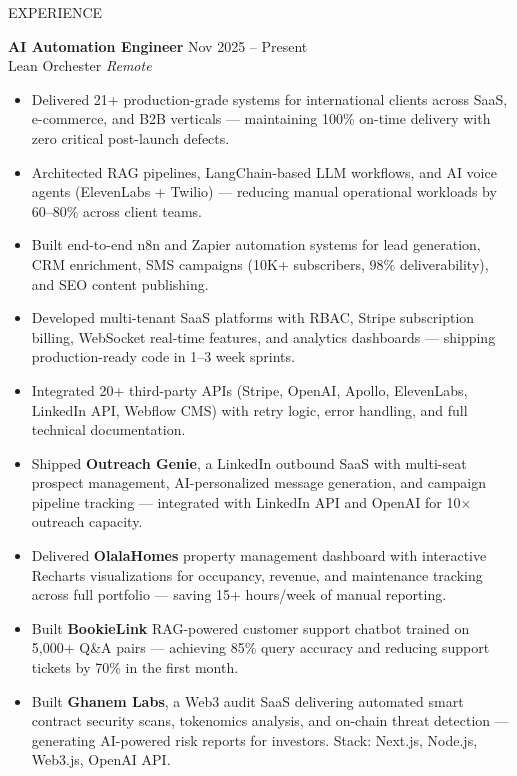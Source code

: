 \documentclass{resume}
\begin{document}

\begin{rSection}{EXPERIENCE}

\textbf{AI Automation Engineer} \hfill Nov 2025 -- Present \\
Lean Orchester \hfill \textit{Remote}
\begin{itemize}
    \itemsep -3pt {}
    \item Delivered 21+ production-grade systems for international clients across SaaS, e-commerce, and B2B verticals — maintaining 100\% on-time delivery with zero critical post-launch defects.
    \item Architected RAG pipelines, LangChain-based LLM workflows, and AI voice agents (ElevenLabs + Twilio) — reducing manual operational workloads by 60--80\% across client teams.
    \item Built end-to-end n8n and Zapier automation systems for lead generation, CRM enrichment, SMS campaigns (10K+ subscribers, 98\% deliverability), and SEO content publishing.
    \item Developed multi-tenant SaaS platforms with RBAC, Stripe subscription billing, WebSocket real-time features, and analytics dashboards — shipping production-ready code in 1--3 week sprints.
    \item Integrated 20+ third-party APIs (Stripe, OpenAI, Apollo, ElevenLabs, LinkedIn API, Webflow CMS) with retry logic, error handling, and full technical documentation.
    \item Shipped \textbf{Outreach Genie}, a LinkedIn outbound SaaS with multi-seat prospect management, AI-personalized message generation, and campaign pipeline tracking — integrated with LinkedIn API and OpenAI for 10$\times$ outreach capacity.
    \item Delivered \textbf{OlalaHomes} property management dashboard with interactive Recharts visualizations for occupancy, revenue, and maintenance tracking across full portfolio — saving 15+ hours/week of manual reporting.
    \item Built \textbf{BookieLink} RAG-powered customer support chatbot trained on 5,000+ Q\&A pairs — achieving 85\% query accuracy and reducing support tickets by 70\% in the first month.
    \item Built \textbf{Ghanem Labs}, a Web3 audit SaaS delivering automated smart contract security scans, tokenomics analysis, and on-chain threat detection — generating AI-powered risk reports for investors. Stack: Next.js, Node.js, Web3.js, OpenAI API.
\end{itemize}


\end{rSection}
\end{document}
